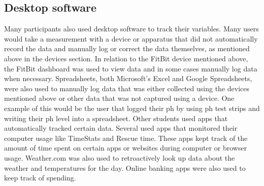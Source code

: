 \subsection{Desktop software} 
    Many participants also used desktop software to track their variables. Many users would take a measurement with a device or apparatus that did not automatically record the data and manually log or correct the data themselves, as mentioned above in the devices section. In relation to the FitBit device mentioned above, the FitBit dashboard was used to view data and in some cases manually log data when necessary. Spreadsheets, both Microsoft’s Excel and Google Spreadsheets, were also used to manually log data that was either collected using the devices mentioned above or other data that was not captured using a device. One example of this would be the user that logged their ph by using ph test strips and writing their ph level into a spreadsheet. 
    Other students used apps that automatically tracked certain data. Several used apps that monitored their computer usage like TimeStats and Rescue time. These apps kept track of the amount of time spent on certain apps or websites during computer or browser usage. Weather.com was also used to retroactively look up data about the weather and temperatures for the day. Online banking apps were also used to keep track of spending.